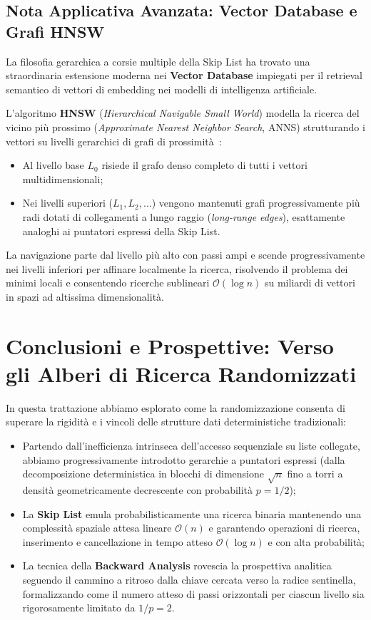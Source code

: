 \FloatBarrier
\subsection{Nota Applicativa Avanzata: Vector Database e Grafi HNSW}
La filosofia gerarchica a corsie multiple della Skip List ha trovato una straordinaria estensione moderna nei \textbf{Vector Database} impiegati per il retrieval semantico di vettori di embedding nei modelli di intelligenza artificiale.

L'algoritmo \textbf{HNSW} (\textit{Hierarchical Navigable Small World}) modella la ricerca del vicino più prossimo (\textit{Approximate Nearest Neighbor Search}, ANNS) strutturando i vettori su livelli gerarchici di grafi di prossimità~\cite{malkov2020}:
\begin{itemize}
  \item Al livello base $L_0$ risiede il grafo denso completo di tutti i vettori multidimensionali;
  \item Nei livelli superiori ($L_1, L_2, \dots$) vengono mantenuti grafi progressivamente più radi dotati di collegamenti a lungo raggio (\textit{long-range edges}), esattamente analoghi ai puntatori espressi della Skip List.
\end{itemize}
La navigazione parte dal livello più alto con passi ampi e scende progressivamente nei livelli inferiori per affinare localmente la ricerca, risolvendo il problema dei minimi locali e consentendo ricerche sublineari $\mathcal{O}(\log n)$ su miliardi di vettori in spazi ad altissima dimensionalità.

\FloatBarrier
\section{Conclusioni e Prospettive: Verso gli Alberi di Ricerca Randomizzati}
\label{sec:skip-list-conclusions}

In questa trattazione abbiamo esplorato come la randomizzazione consenta di superare la rigidit\`a e i vincoli delle strutture dati deterministiche tradizionali:
\begin{itemize}
  \item Partendo dall'inefficienza intrinseca dell'accesso sequenziale su liste collegate, abbiamo progressivamente introdotto gerarchie a puntatori espressi (dalla decomposizione deterministica in blocchi di dimensione $\sqrt{n}$ fino a torri a densit\`a geometricamente decrescente con probabilit\`a $p = 1/2$);
  \item La \textbf{Skip List} emula probabilisticamente una ricerca binaria mantenendo una complessit\`a spaziale attesa lineare $\mathcal{O}(n)$ e garantendo operazioni di ricerca, inserimento e cancellazione in tempo atteso $\mathcal{O}(\log n)$ e con alta probabilit\`a;
  \item La tecnica della \textbf{Backward Analysis} rovescia la prospettiva analitica seguendo il cammino a ritroso dalla chiave cercata verso la radice sentinella, formalizzando come il numero atteso di passi orizzontali per ciascun livello sia rigorosamente limitato da $1/p = 2$.
\end{itemize}

